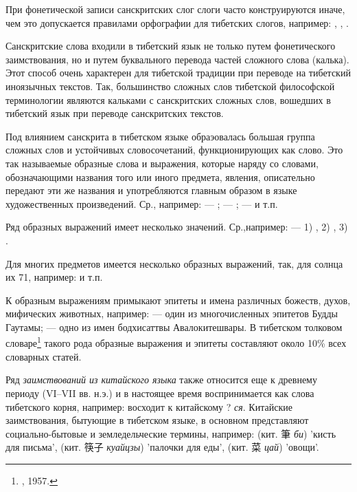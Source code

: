 При фонетической записи санскритских слог слоги часто конструируются иначе, чем это допускается правилами орфографии для тибетских слогов, например: , , .

Санскритские слова входили в тибетский язык не только путем фонетического заимствования, но и путем буквального перевода частей сложного слова (калька). Этот способ очень характерен для тибетской традиции при переводе на тибетский иноязычных текстов. Так, большинство сложных слов тибетской философской терминологии являются кальками с санскритских сложных слов, вошедших в тибетский язык при переводе санскритских текстов.

Под влиянием санскрита в тибетском языке обраэовалась большая группа сложных слов и устойчивых словосочетаний, функционирующих как слово. Это так называемые образные слова и выражения, которые наряду со словами, обозначающими названия того или иного предмета, явления, описательно передают эти же названия и употребляются главным образом в языке художественных произведений.
Ср., например:  --- ;	 --- ;  ---  и т.п.

Ряд образных выражений имеет несколько значений. Ср.,например:  --- 1) , 2) , 3) .

Для многих предметов имеется несколько образных выражений, так, для солнца их 71, например:  и т.п.

К образным выражениям примыкают эпитеты и имена различных божеств, духов, мифических животных, например:  --- один из многочисленных эпитетов Будды Гаутамы;	 --- одно из имен бодхисаттвы Авалокитешвары. В тибетском толковом словаре\footnote[18]{ , 1957. } такого рода образные выражения и эпитеты составляют около 10\% всех словарных статей.

Ряд \emph{заимствований из китайского языка} также относится еще к древнему периоду (VI--VII вв. н.э.) и в настоящее время воспринимается как слова тибетского корня, например:  восходит к китайскому {\chinfont ?} \textit{ся}. Китайские заимствования, бытующие в тибетском языке, в основном представляют социально-бытовые и земледельческие термины, например:  (кит. {\chinfont 筆} \textit{би}) 'кисть для письма',  (кит. {\chinfont 筷子} \textit{куайцзы}) 'палочки для еды',  (кит. {\chinfont 菜} \textit{цай}) 'овощи'.

